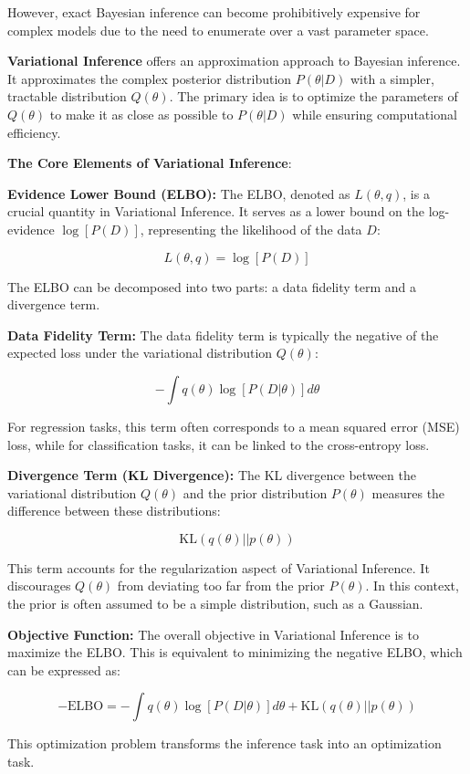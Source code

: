 \documentclass{article}
\begin{document}
However, exact Bayesian inference can become prohibitively expensive for complex models due to the need to enumerate over a vast parameter space.

\textbf{Variational Inference} offers an approximation approach to Bayesian inference. It approximates the complex posterior distribution $P(\theta|D)$ with a simpler, tractable distribution $Q(\theta)$. The primary idea is to optimize the parameters of $Q(\theta)$ to make it as close as possible to $P(\theta|D)$ while ensuring computational efficiency.

\textbf{The Core Elements of Variational Inference}:

\textbf{Evidence Lower Bound (ELBO):}
The ELBO, denoted as $L(\theta, q)$, is a crucial quantity in Variational Inference. It serves as a lower bound on the log-evidence $\log[P(D)]$, representing the likelihood of the data $D$:

\[L(\theta, q) = \log[P(D)]\]

The ELBO can be decomposed into two parts: a data fidelity term and a divergence term.

\textbf{Data Fidelity Term:}
The data fidelity term is typically the negative of the expected loss under the variational distribution $Q(\theta)$:

\[-\int q(\theta)\log[P(D|\theta)]d\theta\]

For regression tasks, this term often corresponds to a mean squared error (MSE) loss, while for classification tasks, it can be linked to the cross-entropy loss.

\textbf{Divergence Term (KL Divergence):}
The KL divergence between the variational distribution $Q(\theta)$ and the prior distribution $P(\theta)$ measures the difference between these distributions:

\[\text{KL}(q(\theta) || p(\theta))\]

This term accounts for the regularization aspect of Variational Inference. It discourages $Q(\theta)$ from deviating too far from the prior $P(\theta)$. In this context, the prior is often assumed to be a simple distribution, such as a Gaussian.

\textbf{Objective Function:}
The overall objective in Variational Inference is to maximize the ELBO. This is equivalent to minimizing the negative ELBO, which can be expressed as:

\[-\text{ELBO} = -\int q(\theta)\log[P(D|\theta)]d\theta + \text{KL}(q(\theta) || p(\theta))\]

This optimization problem transforms the inference task into an optimization task.
\end{document}
